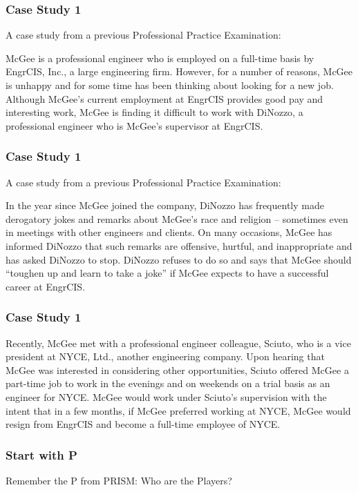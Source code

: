 \begin{frame}
\frametitle{Case Study 1}

A case study from a previous Professional Practice Examination:


	McGee is a professional engineer who is employed on a full-time basis by  EngrCIS, Inc., a large engineering firm.  However, for a number of reasons, McGee is unhappy and for some time has been thinking about looking for a new job.  Although McGee's current employment at EngrCIS provides good pay and interesting work, McGee is finding it difficult to work with DiNozzo, a professional engineer who is McGee's supervisor at EngrCIS.
\end{frame}



\begin{frame}
\frametitle{Case Study 1}

A case study from a previous Professional Practice Examination:


In the year since McGee joined the company, DiNozzo has frequently made derogatory jokes and remarks about McGee's race and religion -- sometimes even in meetings with other engineers and clients. On many occasions, McGee has informed DiNozzo that such remarks are offensive, hurtful, and inappropriate and has asked DiNozzo to stop.  DiNozzo refuses to do so and says that McGee should ``toughen up and learn to take a joke'' if McGee expects to have a successful career at EngrCIS. 
\end{frame}



\begin{frame}
\frametitle{Case Study 1}


Recently, McGee met with a professional engineer colleague, Sciuto, who is a vice president at NYCE, Ltd., another engineering company.  Upon hearing that McGee was interested in considering other opportunities, Sciuto offered McGee a part-time job to work in the evenings and on weekends on a trial basis as an engineer for NYCE.  McGee would work under Sciuto's supervision with the intent that in a few months, if McGee preferred working at NYCE, McGee would resign from EngrCIS and become a full-time employee of NYCE.



\end{frame}



\begin{frame}
\frametitle{Start with P}

Remember the P from PRISM: Who are the Players?


\end{frame}


